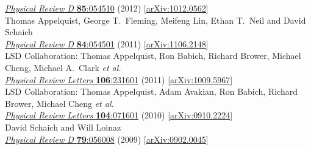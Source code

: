 \begin{spacelist}
\begin{revnumerate}
      \href{http://dx.doi.org/10.1103/PhysRevD.85.054510}{\textit{Physical Review D} \textbf{85}:054510} (2012) [\href{http://arxiv.org/abs/1012.0562}{arXiv:1012.0562}]
    \pagebreakitem
       \\
      Thomas Appelquist, George T.~Fleming, Meifeng Lin, Ethan T.~Neil and David Schaich \\
      \href{http://dx.doi.org/10.1103/PhysRevD.84.054501}{\textit{Physical Review D} \textbf{84}:054501} (2011) [\href{http://arxiv.org/abs/1106.2148}{arXiv:1106.2148}]
    \pagebreakitem
       \\
      LSD Collaboration: Thomas Appelquist, Ron Babich, Richard Brower, Michael Cheng, Michael A.~Clark \textit{et al.} \\ %
      \href{http://dx.doi.org/10.1103/PhysRevLett.106.231601}{\textit{Physical Review Letters} \textbf{106}:231601} (2011) [\href{http://arxiv.org/abs/1009.5967}{arXiv:1009.5967}]
    \pagebreakitem
       \\
      LSD Collaboration: Thomas Appelquist, Adam Avakian, Ron Babich, Richard Brower, Michael Cheng \textit{et al.} \\ %
      \href{http://dx.doi.org/10.1103/PhysRevLett.104.071601}{\textit{Physical Review Letters} \textbf{104}:071601} (2010) [\href{http://arxiv.org/abs/0910.2224}{arXiv:0910.2224}]
    \pagebreakitem
       \\
      David Schaich and Will Loinaz \\
      \href{http://dx.doi.org/10.1103/PhysRevD.79.056008}{\textit{Physical Review D} \textbf{79}:056008} (2009) [\href{http://arxiv.org/abs/0902.0045}{arXiv:0902.0045}] \\
%
%
%
\newpage \hspace{-22 pt}{\large \bfseries Other articles, theses \& white papers} \vspace{-8 pt}

\end{revnumerate}
\end{spacelist}
